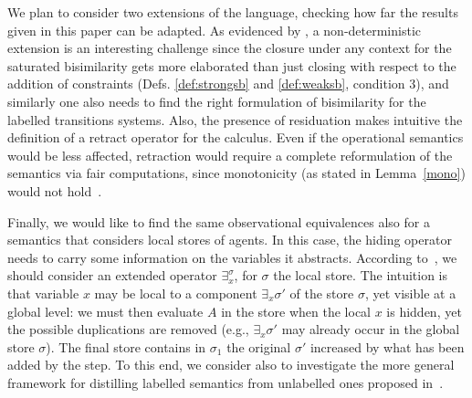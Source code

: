\documentclass[main.tex]{subfiles}
\begin{document}
We plan to consider two extensions of the language, checking how far the results given 
in this paper can be adapted. As evidenced by \cite{Pino:14:ICTAC},
a non-deterministic extension is an 
interesting challenge since the closure under any context for the saturated 
bisimilarity gets more elaborated than just closing
with respect to the addition of constraints (Defs. \ref{def:strongsb} and \ref{def:weaksb}, condition 3), and similarly
one also needs to find the right formulation of bisimilarity for the labelled transitions systems. 
%
Also, the presence of residuation makes intuitive the definition of a retract operator for the calculus. 
%
Even if the operational semantics would be less affected, retraction would require a complete reformulation of the semantics via fair computations, since monotonicity
(as stated in Lemma~\ref{mono}) would not hold~\cite{sefm12,fun14}.

Finally, we would like to find the same observational equivalences also for a semantics that considers local stores of agents. In this case, the hiding operator needs to carry some information on the variables it abstracts.
According to~\cite{extendedHiding}, we should consider an extended operator $\exists_x^\sigma$, for $\sigma$ the local store. The intuition is that variable $x$ may be local to a component $\exists_x \sigma'$ of the store $\sigma$, yet visible at a global level: we must then evaluate $A$ in the store
when the local $x$ is hidden, yet the possible duplications are removed (e.g., $\exists_x \sigma'$ may already occur in the global store $\sigma$). The final store contains in $\sigma_1$ the original $\sigma'$ increased by what has been added by the step.
%
To this end, we consider also to investigate the more general framework for distilling labelled semantics from unlabelled ones proposed 
in~\cite{BonchiGM14}.



%
\end{document}
